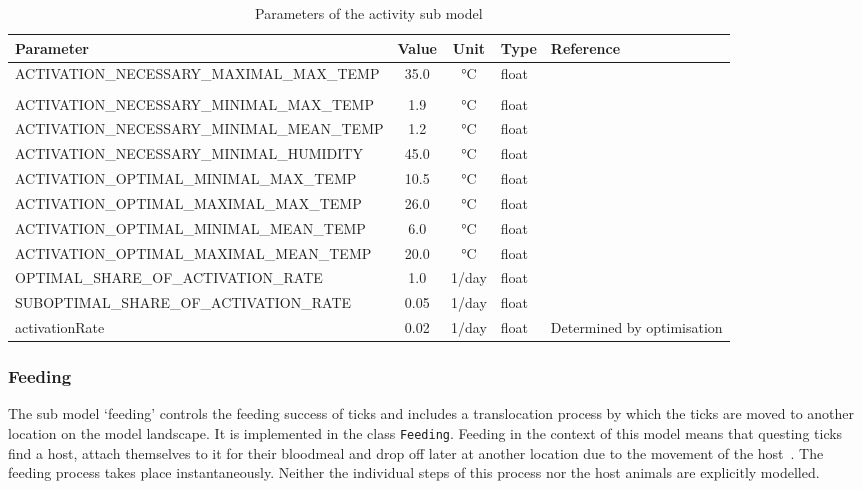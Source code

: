 \documentclass[a4paper, 11pt]{scrartcl}
\newcommand{\inlinecode}[1]{\texttt{\small #1}}
\begin{document}
\begin{table}[h!]
\caption{Parameters of the activity sub model}
\label{tab:activation_parameters}
\begin{tabularx}{\textwidth}{lccll}
\toprule
\textbf{Parameter}	& \textbf{Value} & \textbf{Unit}	& \textbf{Type}	& \textbf{Reference} \\
\midrule
\multirow{2}{*}{\tiny{ACTIVATION\_NECESSARY\_MAXIMAL\_MAX\_TEMP}}	& \multirow{2}{*}{35.0}  & \multirow{2}{*}{°C} & \multirow{2}{*}{float} & ~\cite{Gray.2016} \\
												    &		&	 &		 & \cite{MacLeod.1935} \\
\tiny{ACTIVATION\_NECESSARY\_MINIMAL\_MAX\_TEMP}	&  1.9  & °C & float & \cite{Perret.2000}  		\\
\tiny{ACTIVATION\_NECESSARY\_MINIMAL\_MEAN\_TEMP}&  1.2 	& °C & float & \cite{Perret.2000}		\\
\tiny{ACTIVATION\_NECESSARY\_MINIMAL\_HUMIDITY}	& 45.0  & °C & float & \cite{Greenfield.2011}	\\
\tiny{ACTIVATION\_OPTIMAL\_MINIMAL\_MAX\_TEMP}	& 10.5 	& °C & float & \cite{Perret.2000}		\\
\tiny{ACTIVATION\_OPTIMAL\_MAXIMAL\_MAX\_TEMP}	& 26.0  & °C & float & \cite{Greenfield.2011}	\\
\tiny{ACTIVATION\_OPTIMAL\_MINIMAL\_MEAN\_TEMP}	&  6.0  & °C & float & \cite{Gilbert.2014}		\\
\tiny{ACTIVATION\_OPTIMAL\_MAXIMAL\_MEAN\_TEMP}	& 20.0 	& °C & float & \tiny{\cite{Kubiak.2006}}		\\
\midrule
\tiny{OPTIMAL\_SHARE\_OF\_ACTIVATION\_RATE}		&  1.0  & 1/day & float	&  		\\
\tiny{SUBOPTIMAL\_SHARE\_OF\_ACTIVATION\_RATE}	&  0.05	& 1/day & float	&  		\\
\tiny{activationRate}	   						&  0.02 & 1/day & float	& Determined by optimisation  \\
\bottomrule
\end{tabularx}
\end{table}

\subsubsection{Feeding}\label{feeding}
The sub model `feeding' controls the feeding success of ticks and includes a translocation process by which the ticks are moved to another location on the model landscape. It is implemented in the class \inlinecode{Feeding}. Feeding in the context of this model means that questing ticks find a host, attach themselves to it for their bloodmeal and drop off later at another location due to the movement of the host~\parencite{Medlock.2013}. The feeding process takes place instantaneously. Neither the individual steps of this process nor the host animals are explicitly modelled.
\end{document}
